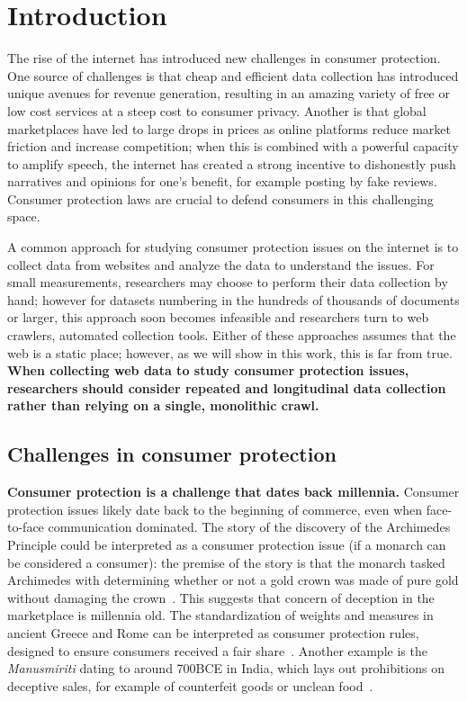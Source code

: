 \chapter{Introduction} \label{ch:introduction}

The rise of the internet has introduced new challenges in consumer protection. One source of challenges is that cheap and efficient data collection has introduced unique avenues for revenue generation, resulting in an amazing variety of free or low cost services at a steep cost to consumer privacy. Another is that global marketplaces have led to large drops in prices as online platforms reduce market friction and increase competition; when this is combined with a powerful capacity to amplify speech, the internet has created a strong incentive to dishonestly push narratives and opinions for one's benefit, for example posting by fake reviews. Consumer protection laws are crucial to defend consumers in this challenging space.

A common approach for studying consumer protection issues on the internet is to collect data from websites and analyze the data to understand the issues. For small measurements, researchers may choose to perform their data collection by hand; however for datasets numbering in the hundreds of thousands of documents or larger, this approach soon becomes infeasible and researchers turn to web crawlers, automated collection tools. Either of these approaches assumes that the web is a static place; however, as we will show in this work, this is far from true. \textbf{When collecting web data to study consumer protection issues, researchers should consider repeated and longitudinal data collection rather than relying on a single, monolithic crawl.}

\section{Challenges in consumer protection}

\textbf{Consumer protection is a challenge that dates back millennia.}
Consumer protection issues likely date back to the beginning of commerce, even when face-to-face communication dominated. The story of the discovery of the Archimedes Principle could be interpreted as a consumer protection issue (if a monarch can be considered a consumer): the premise of the story is that the monarch tasked Archimedes with determining whether or not a gold crown was made of pure gold without damaging the crown~\cite{thompson2008archimedes}. This suggests that concern of deception in the marketplace is millennia old.  The standardization of weights and measures in ancient Greece and Rome can be interpreted as consumer protection rules, designed to ensure consumers received a fair share~\cite{smither2017roman}. Another example is the \textit{Manusmiriti} dating to around 700BCE in India, which lays out prohibitions on deceptive sales, for example of counterfeit goods or unclean food~\cite{devi2016legal}.


